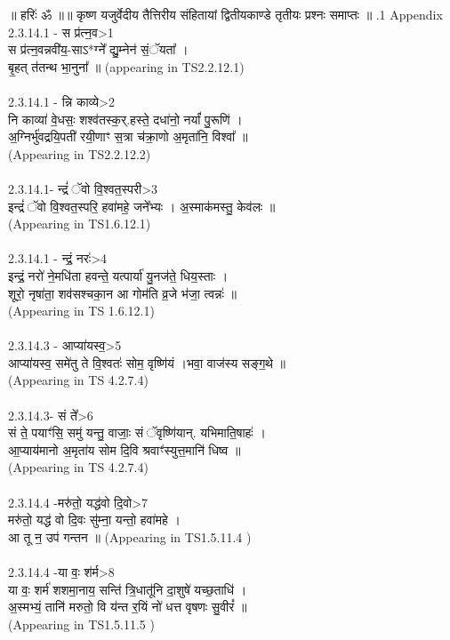 \documentclass[17pt]{extarticle}
\begin{document}
॥ हरिः॑ ॐ ॥॥ कृष्ण यजुर्वेदीय तैत्तिरीय संहितायां द्वितीयकाण्डे तृतीयः प्रश्नः समाप्तः ॥ \newline
{}.1   Appendix\\2.3.14.1 - स प्र॑त्न॒व>1\\स प्र॑त्न॒वन्नवी॑य॒-साऽ*ग्ने᳚ द्यु॒म्नेन॑ सं॒ॅयता᳚ । \\बृ॒हत् त॑तन्थ भा॒नुना᳚ ॥ (appearing in TS2.2.12.1)\\\\2.3.14.1 - न्नि काव्ये>2\\नि काव्या॑ वे॒धसः॒ शश्व॑तस्क॒र्.हस्ते॒ दधा॑नो॒ नर्यां॑ पु॒रूणि॑ ।\\अ॒ग्निर्भु॑वद्रयि॒पती॑ रयी॒णाꣳ स॒त्रा च॑क्रा॒णो अ॒मृता॑नि॒ विश्वा᳚ ॥\\(Appearing in TS2.2.12.2)\\\\2.3.14.1- न्द्रं॑ ॅवो वि॒श्वत॒स्परी>3\\इन्द्रं॑ ॅवो वि॒श्वत॒स्परि॒ हवा॑महे॒ जने᳚भ्यः । अ॒स्माक॑मस्तु॒ केव॑लः ॥\\(Appearing in TS1.6.12.1)\\\\2.3.14.1 - न्द्रं॒ नरः॑>4\\इन्द्रं॒ नरो॑ ने॒मधि॑ता हवन्ते॒ यत्पार्या॑ यु॒नज॑ते॒ धिय॒स्ताः ।\\शूरो॒ नृषा॑ता॒ शव॑सश्चका॒न आ गोम॑ति व्र॒जे भ॑जा॒ त्वन्नः॑ ॥\\(Appearing in TS 1.6.12.1)\\\\2.3.14.3 - आप्या॑यस्व॒>5\\आप्या॑यस्व॒ समे॑तु ते वि॒श्वतः॑ सोम॒ वृष्णि॑यं ।भवा॒ वाज॑स्य सङ्ग॒थे ॥\\(Appearing in TS 4.2.7.4)\\\\2.3.14.3- सं ते᳚>6\\सं ते॒ पयाꣳ॑सि॒ समु॑ यन्तु॒ वाजाः॒ सं ॅवृष्णि॑यान्. यभिमाति॒षाहः॑ ।\\आ॒प्याय॑मानो अ॒मृता॑य सोम दि॒वि श्रवाꣳ॑स्युत्त॒मानि॑ धिष्व ॥\\(Appearing in TS 4.2.7.4)\\\\2.3.14.4 -मरु॑तो॒ यद्ध॑वो दि॒वो>7\\मरु॑तो॒ यद्ध॑ वो दि॒वः सु॑म्ना॒ यन्तो॒ हवा॑महे । \\आ तू न॒ उप॑ गन्तन ॥ (Appearing in TS1.5.11.4 )\\\\2.3.14.4 -या वः॒ श॑र्म>8\\या वः॒ शर्म॑ शशमा॒नाय॒ सन्ति॑ त्रि॒धातू॑नि दा॒शुषे॑ यच्छ॒ताधि॑ । \\अ॒स्मभ्यं॒ तानि॑ मरुतो॒ वि य॑न्त र॒यिं नो॑ धत्त वृषणः सु॒वीरं᳚ ॥\\(Appearing in TS1.5.11.5 ) \\
\pagebreak
        
\end{document}
